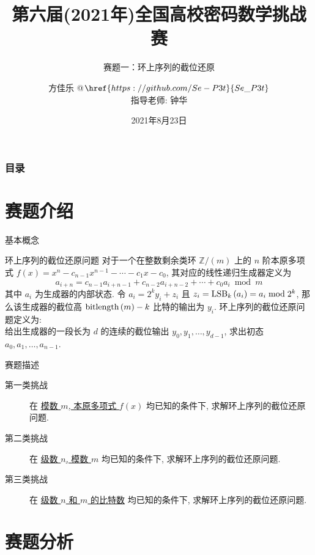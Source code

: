 \documentclass[10pt,compress]{beamer}
\title{第六届(2021年)全国高校密码数学挑战赛}
\subtitle{赛题一：环上序列的截位还原}
\author{方佳乐 @$\href{https://github.com/Se-P3t}{Se\_P3t}$\\
 指导老师: 钟华}
\institute{杭州电子科技大学\, 通信工程学院\\
 信息安全协会\, \texttt{@Vidar-Team}}
\date{2021年8月23日}
\newcommand{\Z}{\ensuremath{\mathbb{Z}}\xspace}
\newcommand{\LSB}[2]{\ensuremath{\textnormal{LSB}_{#1}\left(#2\right)}\xspace}
\newcommand{\bitlength}[1]{\ensuremath{\textnormal{bitlength}\left(#1\right)}\xspace}
\begin{document}
\begin{frame}
  \maketitle
\end{frame}

\setcounter{tocdepth}{1}
\begin{frame}
  \frametitle{目录}
  \tableofcontents
\end{frame}



\section{赛题介绍}

\begin{frame}{基本概念}
  \begin{block}{环上序列的截位还原问题}
    对于一个在整数剩余类环 $\Z / (m)$ 上的 $n$ 阶本原多项式 $f(x) = x^n - c_{n-1} x^{n-1} - \cdots - c_1 x - c_0$, 其对应的线性递归生成器定义为
    $$
    a_{i+n} = c_{n-1} a_{i+n-1} + c_{n-2} a_{i+n-2} + \cdots + c_0 a_i \bmod{m}
    $$
    其中 $a_i$ 为生成器的内部状态. 令 $a_i = 2^k y_i + z_i$ 且 $z_i = \LSB{k}{a_i} = a_i \bmod 2^k$, 那么该生成器的截位高 $\bitlength{m} - k$ 比特的输出为 $y_i$. 环上序列的截位还原问题定义为: \\
    给出生成器的一段长为 $d$ 的连续的截位输出 $y_0, y_1, \ldots, y_{d-1}$, 求出初态 $a_0, a_1, \ldots, a_{n-1}$.
  \end{block}
\end{frame}

\begin{frame}{赛题描述}
  \begin{description}
    \item[第一类挑战] 在 \underline{模数 $m$, 本原多项式 $f(x)$} 均已知的条件下, 求解环上序列的截位还原问题.
    \item[第二类挑战] 在 \underline{级数 $n$, 模数 $m$} 均已知的条件下, 求解环上序列的截位还原问题.
    \item[第三类挑战] 在 \underline{级数 $n$ 和 $m$ 的比特数} 均已知的条件下, 求解环上序列的截位还原问题.
  \end{description}
\end{frame}



\section{赛题分析}
\end{document}
